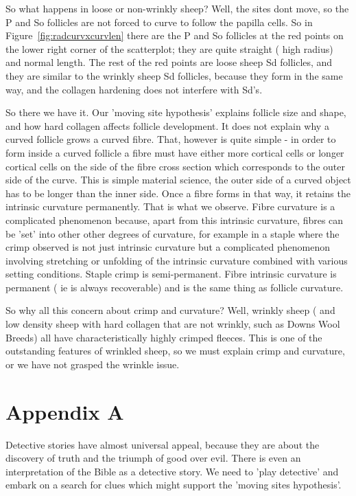 \documentclass[titlepage]{article}  %
\begin{document}
So what happens in loose or non-wrinkly sheep? Well, the sites dont move, so the P and So follicles are not forced to curve to follow the papilla cells. So in Figure~\ref{fig:radcurvxcurvlen} there are the P and So follicles at the red points on the lower right corner of the scatterplot; they are quite straight ( high radius) and normal length. The rest of the red points are loose sheep Sd follicles, and they are similar to the wrinkly sheep Sd follicles, because they form in the same way, and the collagen hardening does not interfere with Sd's.

So there we have it. Our 'moving site hypothesis' explains  follicle size and shape, and how hard collagen affects follicle development. It does not explain why a curved follicle grows a curved fibre. That, however is quite simple - in order to form inside a curved follicle a fibre must have either more cortical cells or longer cortical cells on the side of the fibre cross section which corresponds to the outer side of the curve. This is simple material science, the outer side of a curved object has to be longer than the inner side. Once a fibre forms in  that way, it retains the intrinsic curvature permanently. That is what we observe. Fibre curvature is a complicated phenomenon because, apart from this intrinsic curvature, fibres can be 'set' into other other degrees of curvature, for example in a staple where the crimp observed is not just intrinsic curvature but a complicated phenomenon involving stretching or unfolding of the intrinsic curvature combined with various setting conditions. Staple crimp is semi-permanent. Fibre intrinsic curvature is permanent ( ie is always recoverable) and is the same thing as follicle curvature.

So why all this concern about crimp and curvature? Well, wrinkly sheep ( and  low density sheep with hard collagen that are not wrinkly, such as Downs Wool Breeds)  all have characteristically highly crimped fleeces. This is one of the outstanding features of wrinkled sheep, so we must explain crimp and curvature, or we have not grasped the wrinkle issue.

\appendix
\section{Appendix A}
Detective stories have almost universal appeal, because they are about the discovery of truth and the triumph of good over evil.  There is even an interpretation of the Bible as a detective story. We need to 'play detective' and embark on a search for clues which might support the 'moving sites hypothesis'.
\end{document}
